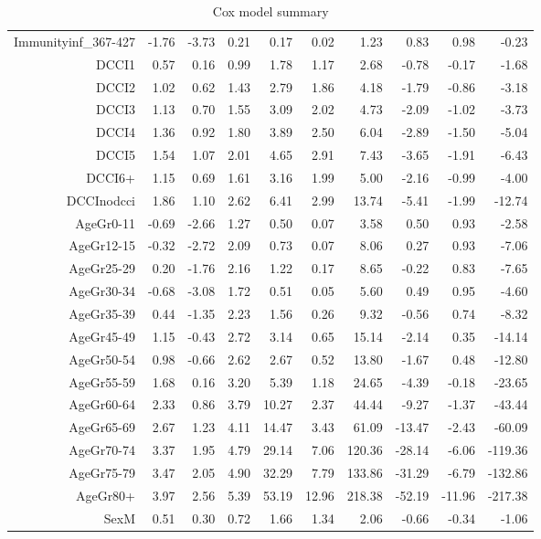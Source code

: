 \begin{table}[ht]
\begin{tabular}{rrrrrrrrrr}
  Immunityinf\_367-427 & -1.76 & -3.73 & 0.21 & 0.17 & 0.02 & 1.23 & 0.83 & 0.98 & -0.23 \\ 
  DCCI1 & 0.57 & 0.16 & 0.99 & 1.78 & 1.17 & 2.68 & -0.78 & -0.17 & -1.68 \\ 
  DCCI2 & 1.02 & 0.62 & 1.43 & 2.79 & 1.86 & 4.18 & -1.79 & -0.86 & -3.18 \\ 
  DCCI3 & 1.13 & 0.70 & 1.55 & 3.09 & 2.02 & 4.73 & -2.09 & -1.02 & -3.73 \\ 
  DCCI4 & 1.36 & 0.92 & 1.80 & 3.89 & 2.50 & 6.04 & -2.89 & -1.50 & -5.04 \\ 
  DCCI5 & 1.54 & 1.07 & 2.01 & 4.65 & 2.91 & 7.43 & -3.65 & -1.91 & -6.43 \\ 
  DCCI6+ & 1.15 & 0.69 & 1.61 & 3.16 & 1.99 & 5.00 & -2.16 & -0.99 & -4.00 \\ 
  DCCInodcci & 1.86 & 1.10 & 2.62 & 6.41 & 2.99 & 13.74 & -5.41 & -1.99 & -12.74 \\ 
  AgeGr0-11 & -0.69 & -2.66 & 1.27 & 0.50 & 0.07 & 3.58 & 0.50 & 0.93 & -2.58 \\ 
  AgeGr12-15 & -0.32 & -2.72 & 2.09 & 0.73 & 0.07 & 8.06 & 0.27 & 0.93 & -7.06 \\ 
  AgeGr25-29 & 0.20 & -1.76 & 2.16 & 1.22 & 0.17 & 8.65 & -0.22 & 0.83 & -7.65 \\ 
  AgeGr30-34 & -0.68 & -3.08 & 1.72 & 0.51 & 0.05 & 5.60 & 0.49 & 0.95 & -4.60 \\ 
  AgeGr35-39 & 0.44 & -1.35 & 2.23 & 1.56 & 0.26 & 9.32 & -0.56 & 0.74 & -8.32 \\ 
  AgeGr45-49 & 1.15 & -0.43 & 2.72 & 3.14 & 0.65 & 15.14 & -2.14 & 0.35 & -14.14 \\ 
  AgeGr50-54 & 0.98 & -0.66 & 2.62 & 2.67 & 0.52 & 13.80 & -1.67 & 0.48 & -12.80 \\ 
  AgeGr55-59 & 1.68 & 0.16 & 3.20 & 5.39 & 1.18 & 24.65 & -4.39 & -0.18 & -23.65 \\ 
  AgeGr60-64 & 2.33 & 0.86 & 3.79 & 10.27 & 2.37 & 44.44 & -9.27 & -1.37 & -43.44 \\ 
  AgeGr65-69 & 2.67 & 1.23 & 4.11 & 14.47 & 3.43 & 61.09 & -13.47 & -2.43 & -60.09 \\ 
  AgeGr70-74 & 3.37 & 1.95 & 4.79 & 29.14 & 7.06 & 120.36 & -28.14 & -6.06 & -119.36 \\ 
  AgeGr75-79 & 3.47 & 2.05 & 4.90 & 32.29 & 7.79 & 133.86 & -31.29 & -6.79 & -132.86 \\ 
  AgeGr80+ & 3.97 & 2.56 & 5.39 & 53.19 & 12.96 & 218.38 & -52.19 & -11.96 & -217.38 \\ 
  SexM & 0.51 & 0.30 & 0.72 & 1.66 & 1.34 & 2.06 & -0.66 & -0.34 & -1.06 \\ 
   \hline
\end{tabular}
\caption{Cox model summary} 
\end{table}
